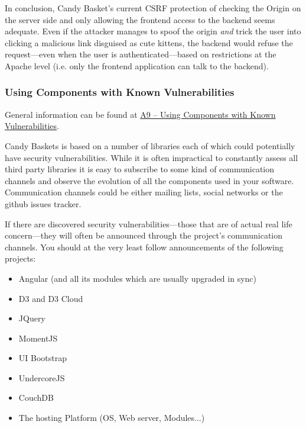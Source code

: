 \documentclass[letterpaper,10pt,english]{sphinxmanual}
\begin{document}
In conclusion, Candy Basket's current CSRF protection of checking the
Origin on the server side and only allowing the frontend access to the
backend seems adequate. Even if the attacker manages to spoof the
origin \emph{and} trick the user into clicking a malicious link disguised as
cute kittens, the backend would refuse the request---even when the user
is authenticated---based on restrictions at the Apache level
(i.e. only the frontend application can talk to the backend).


\subsubsection{Using Components with Known Vulnerabilities}
\label{developer-guide:using-components-with-known-vulnerabilities}
General information can be found at \href{https://owasp.org/index.php/Top\_10\_2013-A9-Using\_Components\_with\_Known\_Vulnerabilities}{A9 -- Using Components with Known
Vulnerabilities}.

Candy Baskets is based on a number of libraries each of which could
potentially have security vulnerabilities. While it is often
impractical to constantly assess all third party libraries it is easy
to subscribe to some kind of communication channels and observe the
evolution of all the components used in your software. Communication
channels could be either mailing lists, social networks or the github
issues tracker.

If there are discovered security vulnerabilities---those that are of
actual real life concern---they will often be announced through the
project's communication channels. You should at the very least follow
announcements of the following projects:
\begin{itemize}
\item {} 
Angular (and all its modules which are usually upgraded in sync)

\item {} 
D3 and D3 Cloud

\item {} 
JQuery

\item {} 
MomentJS

\item {} 
UI Bootstrap

\item {} 
UndercoreJS

\item {} 
CouchDB

\item {} 
The hosting Platform (OS, Web server, Modules...)

\end{itemize}
\end{document}
